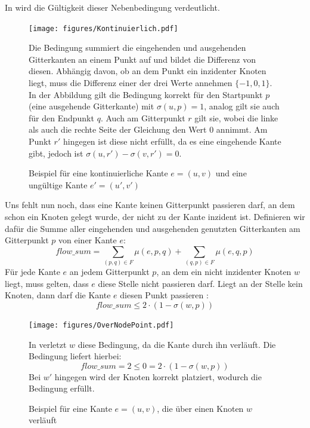 \documentclass[bachelor, german]{algothesis}
\begin{document}
In  wird die Gültigkeit dieser Nebenbedingung verdeutlicht.
\begin{figure}[H]
    \begin{minipage}{0.5\textwidth}
    \centering
    \texttt{[image: figures/Kontinuierlich.pdf]}
    \caption{Beispiel für eine kontinuierliche Kante $e=(u,v)$ und eine ungültige Kante $e'=(u',v')$}
    \label{fig:Kontinuierlich}
    \end{minipage}
    \begin{minipage}{0.47\textwidth}
    \small
    Die Bedingung summiert die eingehenden und ausgehenden Gitterkanten an einem Punkt auf und bildet die Differenz von diesen. Abhängig davon, ob an dem Punkt ein inzidenter Knoten liegt, muss die Differenz einer der drei Werte annehmen $\{-1,0,1\}$.\newline
    In der Abbildung gilt die Bedingung korrekt für den Startpunkt $p$ (eine ausgehende Gitterkante) mit $\sigma(u,p) = 1$, analog gilt sie auch für den Endpunkt $q$. Auch am Gitterpunkt $r$ gilt sie, wobei die linke als auch die rechte Seite der Gleichung den Wert 0 annimmt. Am Punkt $r'$ hingegen ist diese nicht erfüllt, da es eine eingehende Kante gibt, jedoch ist $\sigma(u,r') - \sigma(v,r') = 0$.

    \end{minipage}
\end{figure}
Uns fehlt nun noch, dass eine Kante keinen Gitterpunkt passieren darf, an dem schon ein Knoten gelegt wurde, der nicht zu der Kante inzident ist. Definieren wir dafür die Summe aller eingehenden und ausgehenden genutzten Gitterkanten am Gitterpunkt $p$ von einer Kante $e$: $$flow\_sum = \sum_{(p,q) \in F} \mu(e,p,q) + \sum_{(q,p) \in F} \mu(e,q,p)$$
Für jede Kante $e$ an jedem Gitterpunkt $p$, an dem ein nicht inzidenter Knoten $w$ liegt, muss gelten, dass $e$ diese Stelle nicht passieren darf. Liegt an der Stelle kein Knoten, dann darf die Kante $e$ diesen Punkt passieren :
\begin{equation}
flow\_sum \leq 2 \cdot (1 - \sigma(w,p))
\tag{4}
\end{equation}
\begin{figure}[H]
    \begin{minipage}{0.45\textwidth}
    \centering
    \texttt{[image: figures/OverNodePoint.pdf]}
    \caption{Beispiel für eine Kante $e=(u,v)$, die über einen Knoten $w$ verläuft}
    \label{fig:OverNodePoint}
    \end{minipage}
    \begin{minipage}{0.5\textwidth}
    \small
    In  verletzt $w$ diese Bedingung, da die Kante durch ihn verläuft. 
    Die Bedingung liefert hierbei:$$flow\_sum=2 \leq 0 = 2 \cdot (1-\sigma(w,p))$$ Bei $w'$ hingegen wird der Knoten korrekt platziert, wodurch die Bedingung erfüllt.
    \end{minipage}
\end{figure}
\end{document}
